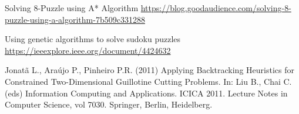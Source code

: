 \documentclass{svproc}
\begin{document}
\begin{thebibliography}{6}
Solving 8-Puzzle using A* Algorithm
\url{https://blog.goodaudience.com/solving-8-puzzle-using-a-algorithm-7b509c331288}

Using genetic algorithms to solve sudoku puzzles
\url{https://ieeexplore.ieee.org/document/4424632}

Jonatã L., Araújo P., Pinheiro P.R. (2011) Applying Backtracking Heuristics for Constrained Two-Dimensional Guillotine Cutting Problems. In: Liu B., Chai C. (eds) Information Computing and Applications. ICICA 2011. Lecture Notes in Computer Science, vol 7030. Springer, Berlin, Heidelberg.

\end{thebibliography}
\end{document}
